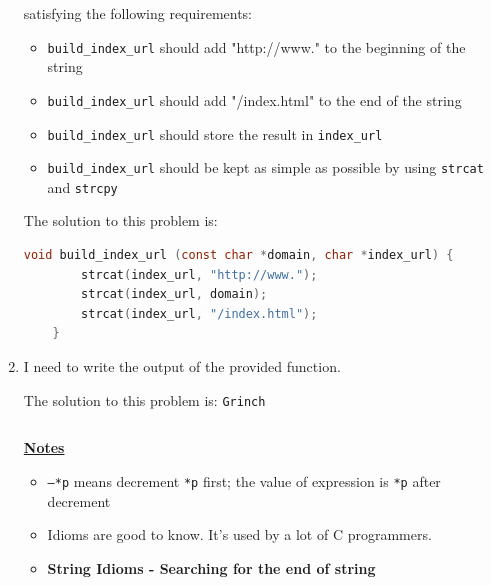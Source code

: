 \documentclass[12pt]{article}
\begin{document}
\begin{enumerate}[1.]
    \bigskip

    satisfying the following requirements:

    \begin{itemize}
        \item \texttt{build\_index\_url} should add "http://www." to the beginning of the string
        \item \texttt{build\_index\_url} should add "/index.html" to the end of the string
        \item \texttt{build\_index\_url} should store the result in \texttt{index\_url}
        \item \texttt{build\_index\_url} should be kept as simple as possible by using \texttt{strcat} and \texttt{strcpy}
    \end{itemize}

    \bigskip

    The solution to this problem is:

    \bigskip


\begin{lstlisting}[language=c]
    void build_index_url (const char *domain, char *index_url) {
        strcat(index_url, "http://www.");
        strcat(index_url, domain);
        strcat(index_url, "/index.html");
    }
\end{lstlisting}

    \item

    I need to write the output of the provided function.

    \bigskip

    The solution to this problem is: \texttt{Grinch}

    \bigskip

\begin{lstlisting}[language=c]

\end{lstlisting}

    \bigskip

    \underline{\textbf{Notes}}

    \bigskip

    \begin{itemize}
        \item \texttt{--*p} means decrement \texttt{*p} first; the value of expression is \texttt{*p} after decrement
        \item Idioms are good to know. It's used by a lot of C programmers.
        \item \textbf{String Idioms - Searching for the end of string}


\end{itemize}
\end{enumerate}
\end{document}
